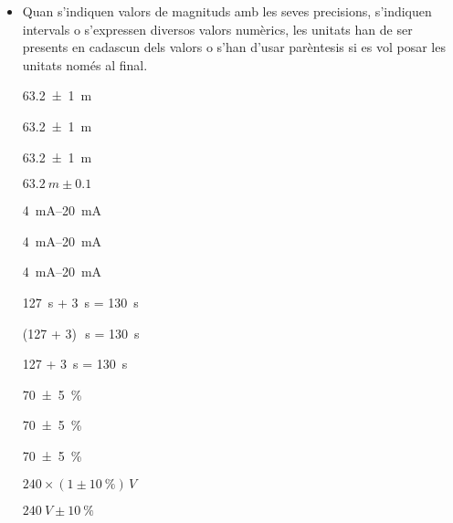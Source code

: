 \begin{itemize}

\item Quan s'indiquen valors de magnituds amb les seves precisions,
s'indiquen intervals o s'expressen diversos valors numèrics, les
unitats han de ser presents en cadascun dels valors o s'han d'usar
parèntesis si es vol posar les unitats només al final.

\textcolor{Green}\faCheckSquare{} \qty[separate-uncertainty, separate-uncertainty-units = repeat]{63,2(1)}{m}

\textcolor{Green}\faCheckSquare{} \qty[separate-uncertainty]{63,2(1)}{m}

\textcolor{Blue}\faExclamationTriangle{} \qty[separate-uncertainty, separate-uncertainty-units = single]{63,2(1)}{m}

\textcolor{Blue}\faExclamationTriangle{}  $\qty{63,2}{m} \pm \num{0,1}$


\textcolor{Green}\faCheckSquare{} \qtyrange{4}{20}{mA}

\textcolor{Green}\faCheckSquare{} \qtyrange[range-units = bracket]{4}{20}{mA}

\textcolor{Blue}\faExclamationTriangle{} \qtyrange[range-units = single]{4}{20}{mA}


\textcolor{Green}\faCheckSquare{} 

\textcolor{Green}\faCheckSquare{} 

\textcolor{Blue}\faExclamationTriangle{} 


\textcolor{Green}\faCheckSquare{} \qty{127}{s} + \qty{3}{s} = \qty{130}{s}

\textcolor{Green}\faCheckSquare{}  (127 + 3)\unit{\,s} = \qty{130}{s}

\textcolor{Blue}\faExclamationTriangle{}  127 + \qty{3}{s} = \qty{130}{s}


\textcolor{Green}\faCheckSquare{} \qty[separate-uncertainty, separate-uncertainty-units = repeat]{70(5)}{\percent}

\textcolor{Green}\faCheckSquare{} \qty[separate-uncertainty]{70(5)}{\percent}

\textcolor{Blue}\faExclamationTriangle{} \qty[separate-uncertainty, separate-uncertainty-units = single]{70(5)}{\percent}


\textcolor{Green}\faCheckSquare{} $240 \times (1 \pm \qty{10}{\percent})\unit{\,V}$

\textcolor{Blue}\faExclamationTriangle{}  $\qty{240}{V} \pm \qty{10}{\percent}$



\end{itemize}

